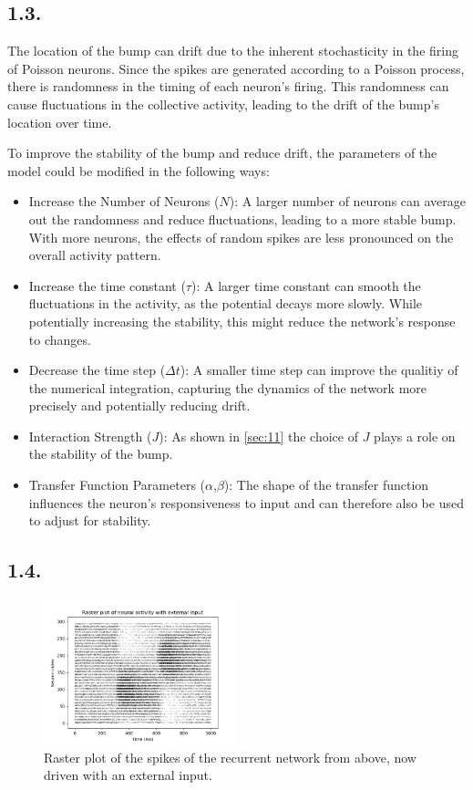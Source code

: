 \documentclass{article}
\begin{document}
\subsection*{1.3.}
The location of the bump can drift due to the inherent stochasticity in the firing of Poisson neurons. Since the spikes are generated according to a Poisson process, there is randomness in the timing of each neuron's firing. This randomness can cause fluctuations in the collective activity, leading to the drift of the bump's location over time.

To improve the stability of the bump and reduce drift, the parameters of the model could be modified in the following ways:
\begin{itemize}
    \item Increase the Number of Neurons (\(N\)): A larger number of neurons can average out the randomness and reduce fluctuations, leading to a more stable bump. With more neurons, the effects of random spikes are less pronounced on the overall activity pattern.
    \item Increase the time constant (\(\tau\)): A larger time constant can smooth the fluctuations in the activity, as the potential decays more slowly. While potentially increasing the stability, this might reduce the network's response to changes.
    \item Decrease the time step (\(\Delta t\)): A smaller time step can improve the qualitiy of the numerical integration, capturing the dynamics of the network more precisely and potentially reducing drift.
    \item Interaction Strength (\(J\)): As shown in \cref{sec:11} the choice of \(J\) plays a role on the stability of the bump.
    \item Transfer Function Parameters (\(\alpha\),\(\beta\)): The shape of the transfer function influences the neuron's responsiveness to input and can therefore also be used to adjust for stability.
\end{itemize}

\subsection*{1.4.}
\begin{figure}[h]
    \centering
    \includegraphics[width=0.5\textwidth]{figures/1.4.extinput_plot_J5.png}
    \caption{Raster plot of the spikes of the recurrent network from above, now driven with an external input.}
    \label{fig:14}
\end{figure}
\end{document}
